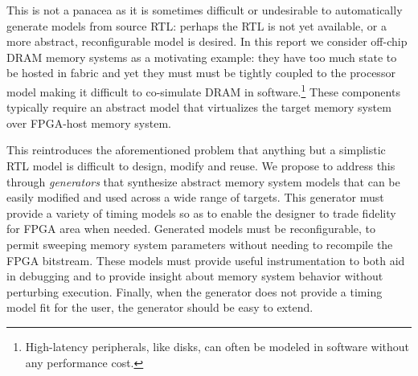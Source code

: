This is not a panacea as it is sometimes difficult or undesirable to
automatically generate models from source RTL: perhaps the RTL is not yet
available, or a more abstract, reconfigurable model is desired. In this report
we consider off-chip DRAM memory systems as a motivating example: they have too
much state to be hosted in fabric and yet they must must be tightly coupled to
the processor model making it difficult to co-simulate DRAM in
software.\footnote{High-latency peripherals, like disks, can often be modeled
in software without any performance cost.\cite{disksim}} These components
typically require an abstract model that virtualizes the target memory system
over FPGA-host memory system.

This reintroduces the aforementioned problem that anything but a simplistic RTL
model is difficult to design, modify and reuse. We propose to address this
through \emph{generators} that synthesize abstract memory system models that
can be easily modified and used across a wide range of targets.  This generator
must provide a variety of timing models so as to enable the designer to trade
fidelity for FPGA area when needed. Generated models must be reconfigurable, to
permit sweeping memory system parameters without needing to recompile the FPGA
bitstream. These models must provide useful instrumentation to both aid in
debugging and to provide insight about memory system behavior without
perturbing execution. Finally, when the generator does not provide a timing
model fit for the user, the generator should be easy to extend.
